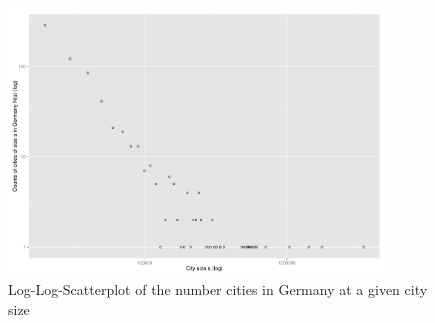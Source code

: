 \documentclass{article}[12pt]
\begin{document}
\begin{figure}[!h]
    \centering
    \includegraphics[width=10cm]{city_plot}%
    \caption{Log-Log-Scatterplot of the number cities in Germany at a given city size}%
    \label{fig:city_plot}%
\end{figure}

\clearpage



\end{document}
